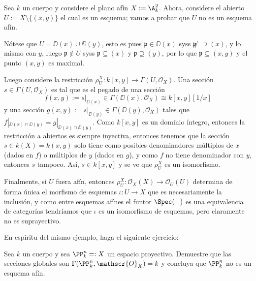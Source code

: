\begin{exn}\label{thm:plane_without_origin}
	Sea $k$ un cuerpo y considere el plano afín $X := \A^2_k$.
	Ahora, considere el abierto $U := X \setminus \{ (x, y) \}$ el cual es un esquema; vamos a probar que $U$ no es un esquema afín.

	Nótese que $U = \DD(x) \cup \DD(y)$, esto es pues $\mathfrak{p} \in \DD(x)$ syss $\mathfrak{p} ̸\supseteq (x)$, y lo
	mismo con $y$, luego $\mathfrak{p} \notin U$ syss $\mathfrak{p} \subseteq (x)$ y $\mathfrak{p} \supseteq (y)$, por lo que
	$\mathfrak{p} \subseteq (x, y)$ y el punto $(x, y)$ es maximal.

	Luego considere la restricción $\rho^X_U \colon k[x, y] \to \Gamma(U, \mathscr{O}_X)$.
	Una sección $s \in \Gamma(U, \mathscr{O}_X )$ es tal que es el pegado de una sección
	$$ f(x, y) := s|_{\DD(x)} \in \Gamma(\DD(x), \mathscr{O}_X ) \cong k[x, y][1/x] $$
	y una sección $g(x, y) := s|_{\DD(y)} \in \Gamma(\DD(y), \mathscr{O}_X )$ tales que $f|_{\DD(x)\cap\DD(y)} = g|_{\DD(x)\cap\DD(y)}$.
	Como $k[x, y]$ es un dominio íntegro, entonces la restricción a abiertos es siempre inyectiva, entonces tenemos que la sección $s \in k(X) = k(x, y)$
	solo tiene como posibles denominadores múltiplos de $x$ (dados en $f$) o múltiplos de $y$ (dados en $g$), y como $f$ no tiene denominador con $y$,
	entonces $s$ tampoco.
	Así, $s \in k[x, y]$ y se ve que $\rho^X_U$ es un isomorfismo.

	Finalmente, si $U$ fuera afín, entonces $\rho^X_U \colon \mathscr{O}_X(X) \to \mathscr{O}_U(U)$ determina de forma única el morfismo de esquemas
	$\iota \colon U \to X$ que es necesariamente la inclusión, y como entre esquemas afínes el funtor $\Spec(-)$ es una equivalencia de categorías
	tendríamos que $\iota$ es un isomorfismo de esquemas, pero claramente no es suprayectivo.
\end{exn}


En espíritu del mismo ejemplo, haga el siguiente ejercicio:
\begin{prob}
	Sea $k$ un cuerpo y sea $\PP^n_k =: X$ un espacio proyectivo.
	Demuestre que las secciones globales son $\Gamma(\PP^n_k , \mathscr{O}_X ) = k$ y concluya que $\PP^n_k$ no es un esquema afín.
\end{prob}

